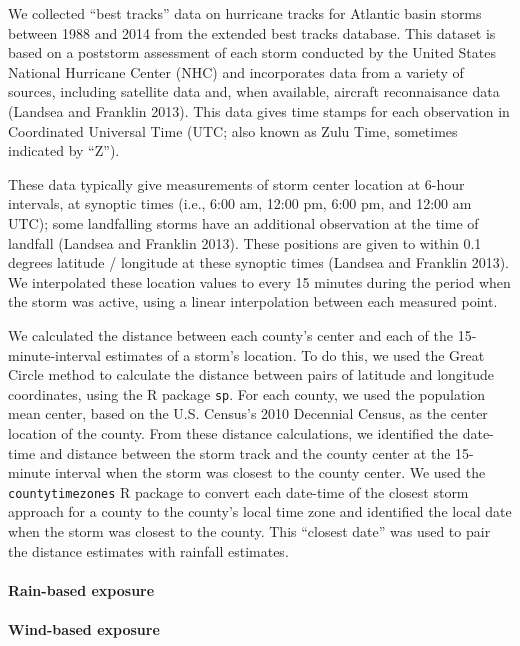 \documentclass[]{elsarticle} %
\begin{document}
We collected ``best tracks'' data on hurricane tracks for Atlantic basin
storms between 1988 and 2014 from the extended best tracks database.
This dataset is based on a poststorm assessment of each storm conducted
by the United States National Hurricane Center (NHC) and incorporates
data from a variety of sources, including satellite data and, when
available, aircraft reconnaisance data (Landsea and Franklin 2013). This
data gives time stamps for each observation in Coordinated Universal
Time (UTC; also known as Zulu Time, sometimes indicated by ``Z'').

These data typically give measurements of storm center location at
6-hour intervals, at synoptic times (i.e., 6:00 am, 12:00 pm, 6:00 pm,
and 12:00 am UTC); some landfalling storms have an additional
observation at the time of landfall (Landsea and Franklin 2013). These
positions are given to within 0.1 degrees latitude / longitude at these
synoptic times (Landsea and Franklin 2013). We interpolated these
location values to every 15 minutes during the period when the storm was
active, using a linear interpolation between each measured point.

We calculated the distance between each county's center and each of the
15-minute-interval estimates of a storm's location. To do this, we used
the Great Circle method to calculate the distance between pairs of
latitude and longitude coordinates, using the R package \texttt{sp}. For
each county, we used the population mean center, based on the U.S.
Census's 2010 Decennial Census, as the center location of the county.
From these distance calculations, we identified the date-time and
distance between the storm track and the county center at the 15-minute
interval when the storm was closest to the county center. We used the
\texttt{countytimezones} R package to convert each date-time of the
closest storm approach for a county to the county's local time zone and
identified the local date when the storm was closest to the county. This
``closest date'' was used to pair the distance estimates with rainfall
estimates.

\paragraph{Rain-based exposure}\label{rain-based-exposure}

\paragraph{Wind-based exposure}\label{wind-based-exposure}
\end{document}
